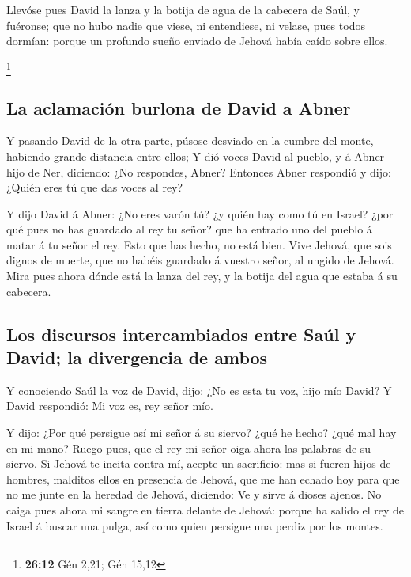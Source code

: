  Llevóse pues David la lanza y la botija de agua de la
cabecera de Saúl, y fuéronse; que no hubo nadie que viese, ni
entendiese, ni velase, pues todos dormían: porque un profundo sueño
enviado de Jehová había caído sobre ellos.

\footnote{\textbf{26:12} Gén 2,21; Gén 15,12}

\hypertarget{la-aclamaciuxf3n-burlona-de-david-a-abner}{%
\subsection{La aclamación burlona de David a
Abner}\label{la-aclamaciuxf3n-burlona-de-david-a-abner}}

 Y pasando David de la otra parte, púsose desviado en la
cumbre del monte, habiendo grande distancia entre ellos; 
Y dió voces David al pueblo, y á Abner hijo de Ner, diciendo: ¿No
respondes, Abner? Entonces Abner respondió y dijo: ¿Quién eres tú que
das voces al rey?

 Y dijo David á Abner: ¿No eres varón tú? ¿y quién hay
como tú en Israel? ¿por qué pues no has guardado al rey tu señor? que ha
entrado uno del pueblo á matar á tu señor el rey.  Esto
que has hecho, no está bien. Vive Jehová, que sois dignos de muerte, que
no habéis guardado á vuestro señor, al ungido de Jehová. Mira pues ahora
dónde está la lanza del rey, y la botija del agua que estaba á su
cabecera.

\hypertarget{los-discursos-intercambiados-entre-sauxfal-y-david-la-divergencia-de-ambos}{%
\subsection{Los discursos intercambiados entre Saúl y David; la
divergencia de
ambos}\label{los-discursos-intercambiados-entre-sauxfal-y-david-la-divergencia-de-ambos}}

 Y conociendo Saúl la voz de David, dijo: ¿No es esta tu
voz, hijo mío David? Y David respondió: Mi voz es, rey señor mío.

 Y dijo: ¿Por qué persigue así mi señor á su siervo? ¿qué
he hecho? ¿qué mal hay en mi mano?  Ruego pues, que el
rey mi señor oiga ahora las palabras de su siervo. Si Jehová te incita
contra mí, acepte un sacrificio: mas si fueren hijos de hombres,
malditos ellos en presencia de Jehová, que me han echado hoy para que no
me junte en la heredad de Jehová, diciendo: Ve y sirve á dioses ajenos.
 No caiga pues ahora mi sangre en tierra delante de
Jehová: porque ha salido el rey de Israel á buscar una pulga, así como
quien persigue una perdiz por los montes.

